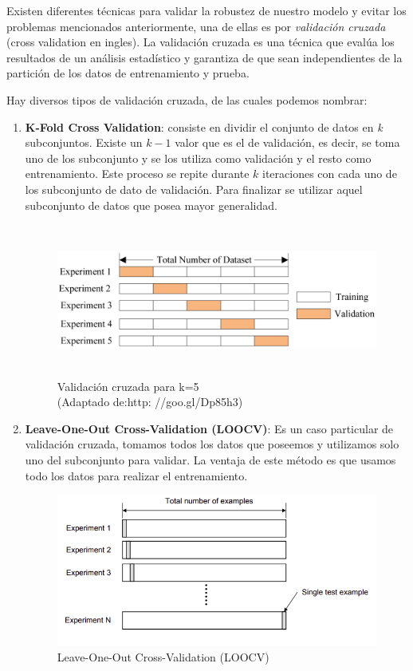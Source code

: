 Existen diferentes técnicas para validar la robustez de nuestro modelo y evitar los problemas mencionados anteriormente, una de ellas es por  \textit{validación cruzada} (cross validation en ingles). La validación cruzada es una técnica que evalúa los resultados de un análisis estadístico y garantiza de que sean independientes de la partición de los datos de entrenamiento y prueba. 

Hay diversos tipos de validación cruzada, de las cuales podemos nombrar:

\begin{enumerate}

\item \textbf{K-Fold Cross Validation}: consiste en dividir el conjunto de datos en \textit{k} subconjuntos. Existe un $k-1 $ valor que es el de validación, es decir, se toma uno de los subconjunto y se los utiliza como validación y el resto como entrenamiento.  Este proceso se repite durante $k $ iteraciones con cada uno de los subconjunto de dato de validación. Para finalizar se utilizar aquel subconjunto de datos que posea mayor generalidad.
\begin{figure}[H]
 \centering
  \includegraphics[height=5cm,keepaspectratio=true,clip=true]{imagenes/Logos/crossvalidat.png}
  \caption{Validación cruzada para k=5\\(Adaptado de:{http: //goo.gl/Dp85h3})}
	\label{Fig: crossvalidation}
\end{figure}

\item \textbf{Leave-One-Out Cross-Validation (LOOCV)}: Es un caso particular de validación cruzada, tomamos todos los datos que poseemos y utilizamos solo uno del subconjunto para validar. La ventaja de este método es que usamos todo los datos para realizar el entrenamiento.

\begin{figure}[H]
 \centering
  \includegraphics[height=5cm,keepaspectratio=true,clip=true]{imagenes/MarcoTeorico/cross-validation-LOOCV.png}
  \caption{Leave-One-Out Cross-Validation (LOOCV)}
	\label{Fig: crossvalidation-LOOCV}
\end{figure}


\end{enumerate}
